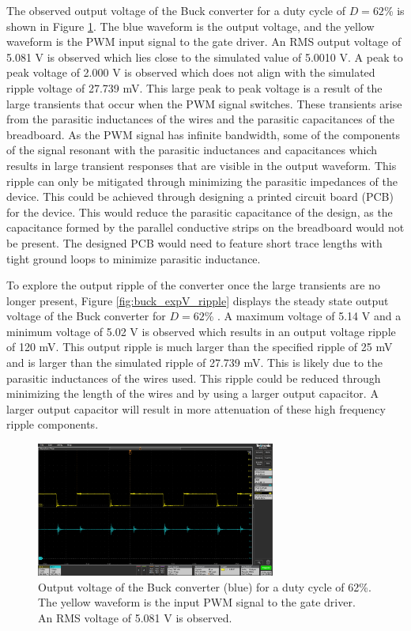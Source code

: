 \documentclass[12pt,twoside]{scrartcl}
\begin{document}
\noindent The observed output voltage of the Buck converter for a duty cycle of $D = 62$\% is shown in Figure \ref{fig:buck_expV_newD}. The blue waveform is the output voltage, and the yellow waveform is the PWM input signal to the gate driver. An RMS output voltage of 5.081 V is observed which lies close to the simulated value of 5.0010 V. A peak to peak voltage of 2.000 V is observed which does not align with the simulated ripple voltage of 27.739 mV. This large peak to peak voltage is a result of the large transients that occur when the PWM signal switches. These transients arise from the parasitic inductances of the wires and the parasitic capacitances of the breadboard. As the PWM signal has infinite bandwidth, some of the components of the signal resonant with the parasitic inductances and capacitances which results in large transient responses that are visible in the output waveform. This ripple can only be mitigated through minimizing the parasitic impedances of the device. This could be achieved through designing a printed circuit board (PCB) for the device. This would reduce the parasitic capacitance of the design, as the capacitance formed by the parallel conductive strips on the breadboard would not be present.  The designed PCB would need to feature short trace lengths with tight ground loops to minimize parasitic inductance.\par
\vspace{5mm}
\noindent To explore the output ripple of the converter once the large transients are no longer present, Figure \ref{fig:buck_expV_ripple} displays the steady state output voltage of the Buck converter for $D = 62$\% . A maximum voltage of 5.14 V and a minimum voltage of 5.02 V is observed which results in an output voltage ripple of 120 mV. This output ripple is much larger than the specified ripple of 25 mV and is larger than the simulated ripple of 27.739 mV.  This is likely due to the parasitic inductances of the wires used. This ripple could be reduced through minimizing the length of the wires and by using a larger output capacitor. A larger output capacitor will result in more attenuation of these high frequency ripple components.\par
\newpage
\begin{figure}[h!]
    \centering
    \includegraphics[width=0.7\textwidth]{buck_expV_newD}
    \caption{Output voltage of the Buck converter (blue) for a duty cycle of 62\%. The yellow waveform is the input PWM signal to the gate driver. An RMS voltage of 5.081 V is observed.}
    \label{fig:buck_expV_newD}
\end{figure}
\end{document}
